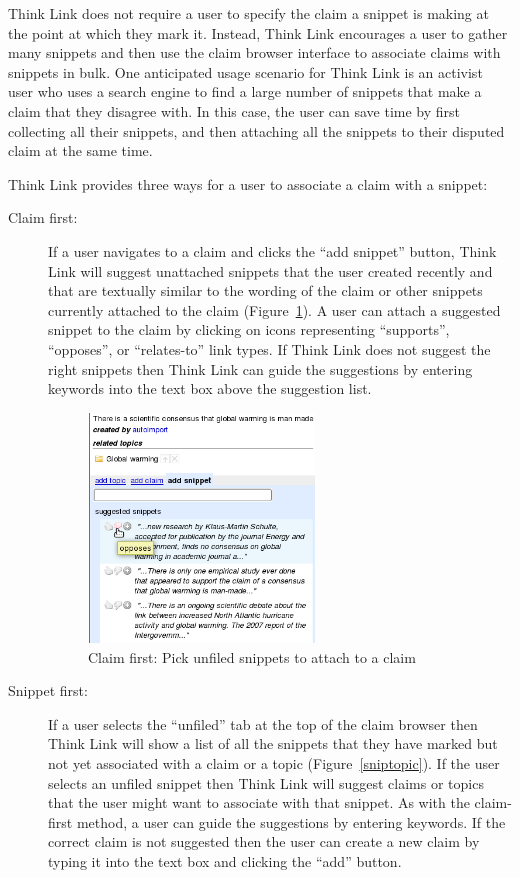 \documentclass{chi2009}
\begin{document}
Think Link does not require a user to specify the claim a snippet is making at the point at which they mark it. Instead, Think Link encourages a user to gather many snippets and then use the claim browser interface to associate claims with snippets in bulk.
One anticipated usage scenario for Think Link is an activist user who uses a search engine to find a large number of snippets that make a claim that they disagree with. 
In this case, the user can save time by first collecting all their snippets, and then attaching all the snippets to their disputed claim at the same time.

Think Link provides three ways for a user to associate a claim with a snippet:

\begin{description}
\item[Claim first:] If a user navigates to a claim and clicks the ``add snippet'' button, Think Link will suggest unattached snippets that the user created recently and that are textually similar to the wording of the claim or other snippets currently attached to the claim (Figure~\ref{snipclaim}). A user can attach a suggested snippet to the claim by clicking on icons representing ``supports'', ``opposes'', or ``relates-to'' link types. If Think Link does not suggest the right snippets then Think Link can guide the suggestions by entering keywords into the text box above the suggestion list.

\begin{figure}[tb]
	\begin{center}
	\includegraphics[width=6cm]{../screenshots/v2_sugsnippet.png}
	\caption{Claim first: Pick unfiled snippets to attach to a claim}
	\label{snipclaim}
	\end{center}
\end{figure}

\item[Snippet first:] If a user selects the ``unfiled'' tab at the top of the claim browser then Think Link will show a list of all the snippets that they have marked but not yet associated with a claim or a topic (Figure~\ref{sniptopic}). If the user selects an unfiled snippet then Think Link will suggest claims or topics that the user might want to associate with that snippet. As with the claim-first method, a user can guide the suggestions by entering keywords. If the correct claim is not suggested then the user can create a new claim by typing it into the text box and clicking the ``add'' button.


\end{description}
\end{document}
